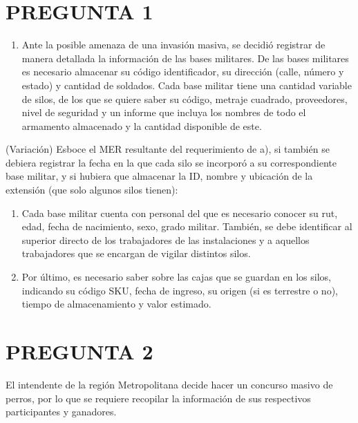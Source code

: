 \documentclass[letterpaper]{article}
\begin{document}
\section{PREGUNTA 1}

\begin{enumerate}

    \item Ante la posible amenaza de una invasión masiva, se decidió registrar de manera detallada la información de las bases militares. De las bases militares es necesario almacenar su código identificador, su dirección (calle, número y estado) y cantidad de soldados. Cada base militar tiene una cantidad variable de silos, de los que se quiere saber su código, metraje cuadrado, proveedores, nivel de seguridad y un informe que incluya los nombres de todo el armamento almacenado y la cantidad disponible de este.

\end{enumerate}
(Variación) Esboce el MER resultante del requerimiento de a), si también se debiera registrar la fecha en la que cada silo se incorporó a su correspondiente base militar, y si hubiera que almacenar la ID, nombre y ubicación de la extensión (que solo algunos silos tienen):

\begin{enumerate}[resume]

    \item Cada base militar cuenta con personal del que es necesario conocer su rut, edad, fecha de nacimiento, sexo, grado militar. También, se debe identificar al superior directo de los trabajadores de las instalaciones y a aquellos trabajadores que se encargan de vigilar distintos silos.
    \item Por último, es necesario saber sobre las cajas que se guardan en los silos, indicando su código SKU, fecha de ingreso, su origen (si es terrestre o no), tiempo de almacenamiento y valor estimado.
\end{enumerate}

\section{PREGUNTA 2}
El intendente de la región Metropolitana decide hacer un concurso masivo de perros, por lo que se requiere recopilar la información de sus respectivos participantes y ganadores.
\end{document}
